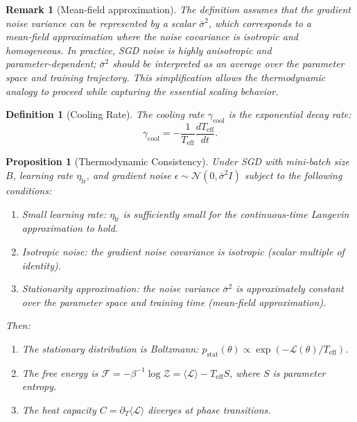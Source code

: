 \documentclass[11pt, a4paper]{article}
\newtheorem{dfn}[theo]{Definition}
\newtheorem{prop}[theo]{Proposition}
\theoremstyle{plain}
\newtheorem*{remark}{Remark}
\def\sF{{\mathcal F}}
\def\sL{{\mathcal L}}
\def\sZ{{\mathcal Z}}
\begin{document}
\begin{remark}[Mean‑field approximation]
The definition assumes that the gradient noise variance can be represented by a scalar $\bar{\sigma}^2$, which corresponds to a mean‑field approximation where the noise covariance is isotropic and homogeneous. In practice, SGD noise is highly anisotropic and parameter‑dependent; $\bar{\sigma}^2$ should be interpreted as an average over the parameter space and training trajectory. This simplification allows the thermodynamic analogy to proceed while capturing the essential scaling behavior.
\end{remark}

\begin{dfn}[Cooling Rate]\label{dfn:cooling_rate}
The cooling rate $\gamma_{\text{cool}}$ is the exponential decay rate:
\begin{equation}
\gamma_{\text{cool}} = -\frac{1}{T_{\text{eff}}} \frac{dT_{\text{eff}}}{dt}.
\label{eq:gamma_cool}
\end{equation}
\end{dfn}

\begin{prop}[Thermodynamic Consistency]\label{prop:thermodynamic}
Under SGD with mini-batch size $B$, learning rate $\eta_{\text{lr}}$, and gradient noise $\epsilon \sim \mathcal{N}(0, \bar{\sigma}^2 I)$ subject to the following conditions:
\begin{enumerate}
    \item Small learning rate: $\eta_{\text{lr}}$ is sufficiently small for the continuous-time Langevin approximation to hold.
    \item Isotropic noise: the gradient noise covariance is isotropic (scalar multiple of identity).
    \item Stationarity approximation: the noise variance $\bar{\sigma}^2$ is approximately constant over the parameter space and training time (mean-field approximation).
\end{enumerate}
Then:
\begin{enumerate}
    \item The stationary distribution is Boltzmann: $p_{\text{stat}}(\theta) \propto \exp(-\mathcal{L}(\theta)/T_{\text{eff}})$.
    \item The free energy is $\sF = -\beta^{-1}\log\sZ = \langle\sL\rangle - T_{\text{eff}} S$, where $S$ is parameter entropy.
    \item The heat capacity $C = \partial_T\langle\sL\rangle$ diverges at phase transitions.
\end{enumerate}
\end{prop}
\end{document}
